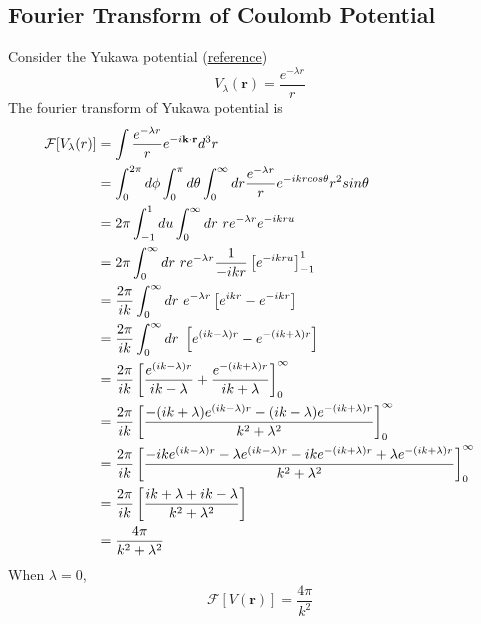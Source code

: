 \documentclass{article}
\begin{document}
    \subsection*{Fourier Transform of Coulomb Potential}
        Consider the Yukawa potential (\href{https://blog.cupcakephysics.com/electromagnetism/math%20methods/2014/10/04/the-fourier-transform-of-the-coulomb-potential.html}{reference})
        \begin{equation}
            V_\lambda(\textbf{r}) = \frac{e^{-\lambda r}}{r}
        \end{equation}
        The fourier transform of Yukawa potential is
        \begin{align}
            \mathcal{F}[V_\lambda(r)] &= \int \frac{e^{-\lambda r}}{r} e^{-i\textbf{k}\cdot\textbf{r}} d^3r\notag\\
            &= \int_0^{2\pi}d\phi \int_0^\pi d\theta \int_0^\infty dr \frac{e^{-\lambda r}}{r}e^{-ikr cos\theta}r^2sin\theta\notag\\
            &= 2\pi\int_{-1}^1du \int_0^\infty dr\ re^{-\lambda r} e^{-ikru}\notag\\
            &= 2\pi \int_0^\infty dr\ re^{-\lambda r} \frac{1}{-ikr}\left[e^{-ikru}\right]_{-1}^1\notag\\
            &= \frac{2\pi}{ik} \int_0^\infty dr\ e^{-\lambda r} \left[e^{ikr}-e^{-ikr}\right]\notag\\
            &= \frac{2\pi}{ik} \int_0^\infty dr\ \left[e^{(ik-\lambda)r}-e^{-(ik+\lambda)r}\right]\notag\\
            &= \frac{2\pi}{ik} \left[\frac{e^{(ik-\lambda)r}}{ik-\lambda}+\frac{e^{-(ik+\lambda)r}}{ik+\lambda}\right]_0^\infty\notag\\
            &= \frac{2\pi}{ik} \left[\frac{-(ik+\lambda)e^{(ik-\lambda)r}-(ik-\lambda)e^{-(ik+\lambda)r}}{k^2+\lambda^2}\right]_0^\infty\notag\\
            &= \frac{2\pi}{ik} \left[\frac{-ike^{(ik-\lambda)r}-\lambda e^{(ik-\lambda)r}-ike^{-(ik+\lambda)r}+\lambda e^{-(ik+\lambda)r}}{k^2+\lambda^2}\right]_0^\infty\notag\\
            &= \frac{2\pi}{ik} \left[\frac{ik+\lambda+ik-\lambda}{k^2+\lambda^2}\right]\notag\\
            &= \frac{4\pi}{k^2+\lambda^2}
        \end{align}
        When $\lambda=0$,
        \begin{equation}
            \mathcal{F}[V(\textbf{r})] = \frac{4\pi}{k^2}
        \end{equation}
\end{document}
